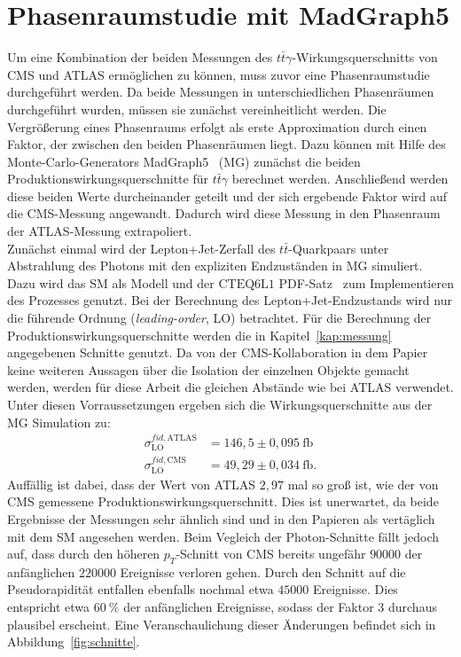 \section{Phasenraumstudie mit MadGraph5}
\label{phasencms}
Um eine Kombination der beiden Messungen des $t\bar{t}\gamma$-Wirkungsquerschnitts von CMS und ATLAS ermöglichen zu können, muss zuvor eine Phasenraumstudie durchgeführt werden. Da beide Messungen in unterschiedlichen Phasenräumen durchgeführt wurden, müssen sie zunächst vereinheitlicht werden. Die Vergrößerung eines Phasenraums erfolgt als erste Approximation durch einen Faktor, der zwischen den beiden Phasenräumen liegt. Dazu können mit Hilfe des Monte-Carlo-Generators MadGraph5~\cite{Alwall:2014hca} (MG) zunächst die beiden Produktionswirkungsquerschnitte für $t\bar{t}\gamma$ berechnet werden.
Anschließend werden diese beiden Werte durcheinander geteilt und der sich ergebende Faktor wird auf die CMS-Messung angewandt. Dadurch wird diese Messung in den Phasenraum der ATLAS-Messung extrapoliert.\\
Zunächst einmal wird der Lepton+Jet-Zerfall des $t\bar{t}$-Quarkpaars unter Abstrahlung des Photons mit den expliziten Endzuständen in MG simuliert.
Dazu wird das SM als Modell und der $\text{CTEQ}6\text{L}1$ PDF-Satz~\cite{Paakkinen:2018zbs} zum Implementieren des Prozesses genutzt. Bei der Berechnung des Lepton+Jet-Endzustands wird nur die führende Ordnung (\textit{leading-order}, LO) betrachtet. Für die Berechnung der Produktionswirkungsquerschnitte werden die in Kapitel~\ref{kap:messung} angegebenen Schnitte genutzt.
Da von der CMS-Kollaboration in dem Papier keine weiteren Aussagen über die Isolation der einzelnen Objekte gemacht werden, werden für diese Arbeit die gleichen Abstände wie bei ATLAS verwendet.
Unter diesen Vorraussetzungen ergeben sich die Wirkungsquerschnitte aus der MG Simulation zu:
\begin{align}
  \sigma^{fid, \text{ATLAS}}_{\text{LO}} &= 146,5 \pm 0,095~ \si{\femto\barn}\\
  \sigma^{fid, \text{CMS}}_{\text{LO}} &= 49,29 \pm 0,034~ \si{\femto\barn}.
\end{align}
Auffällig ist dabei, dass der Wert von ATLAS $2,97$ mal so groß ist, wie der von CMS gemessene Produktionswirkungsquerschnitt. Dies ist unerwartet, da beide Ergebnisse der Messungen sehr ähnlich sind und in den Papieren als vertäglich mit dem SM angesehen werden.
Beim Vegleich der Photon-Schnitte fällt jedoch auf, dass durch den höheren $p_T$-Schnitt von CMS bereits ungefähr $90000$ der anfänglichen $220000$ Ereignisse verloren gehen. Durch den Schnitt auf die Pseudorapidität entfallen ebenfalls nochmal etwa $45000$ Ereignisse. Dies entspricht etwa $\SI{60}{\percent}$ der anfänglichen Ereignisse, sodass der Faktor $3$ durchaus plausibel erscheint. Eine Veranschaulichung dieser Änderungen befindet sich in Abbildung~\ref{fig:schnitte}.\\
